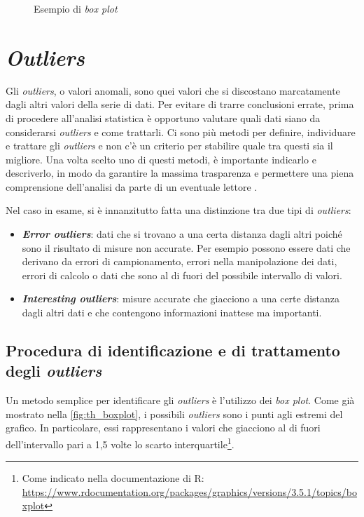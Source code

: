 \begin{figure}[h]
		\centering
	\caption{Esempio di \textit{box plot}}
	\label{fig:th_boxplot}
\end{figure} \pagebreak

\section{\textit{Outliers}}
\label{sec:outliers}
Gli \textit{outliers}, o valori anomali, sono quei valori che si discostano marcatamente dagli altri valori della serie di dati. Per evitare di trarre conclusioni errate, prima di procedere all'analisi statistica è opportuno valutare quali dati siano da considerarsi \textit{outliers} e come trattarli. 
Ci sono più metodi per definire, individuare e trattare gli \textit{outliers} e non c'è un criterio per stabilire quale tra questi sia il migliore. Una volta scelto uno di questi metodi, è importante indicarlo e descriverlo, in modo da garantire la massima trasparenza e permettere una piena comprensione dell'analisi da parte di un eventuale lettore \cite{outliers}.

Nel caso in esame, si è innanzitutto fatta una distinzione tra due tipi di \textit{outliers}:
\begin{itemize}
	\item \textbf{\textit{Error outliers}}: dati che si trovano a una certa distanza dagli altri poiché sono il risultato di misure non accurate. Per esempio possono essere dati che derivano da errori di campionamento, errori nella manipolazione dei dati, errori di calcolo o dati che sono al di fuori del possibile intervallo di valori.
	\item \textbf{\textit{Interesting outliers}}: misure accurate che giacciono a una certe distanza dagli altri dati e che contengono informazioni inattese ma importanti.
\end{itemize}

\subsection{Procedura di identificazione e di trattamento degli \textit{outliers}}
\label{subsec:procedura_outliers}
Un metodo semplice per identificare gli \textit{outliers} è l'utilizzo dei \textit{box plot}. Come già mostrato nella \autoref{fig:th_boxplot}, i possibili \textit{outliers} sono i punti agli estremi del grafico. In particolare, essi rappresentano i valori che giacciono al di fuori dell'intervallo pari a 1,5 volte lo scarto interquartile\footnote{Come indicato nella documentazione di R: \url{https://www.rdocumentation.org/packages/graphics/versions/3.5.1/topics/boxplot}}.

